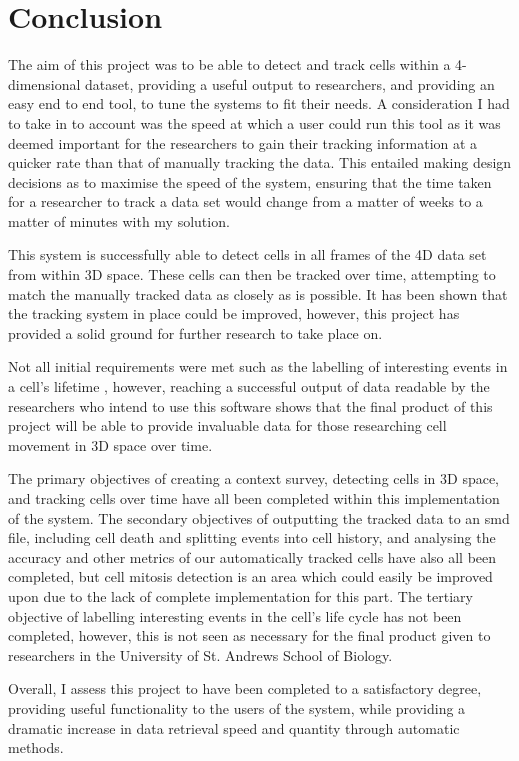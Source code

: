 \documentclass[12pt a4paper]{article}
\begin{document}
\section{Conclusion}
The aim of this project was to be able to detect and track cells within a 4-dimensional dataset, providing a useful output to researchers, and providing an easy end to end tool, to tune the systems to fit their needs. A consideration I had to take in to account was the speed at which a user could run this tool as it was deemed important for the researchers to gain their tracking information at a quicker rate than that of manually tracking the data. This entailed making design decisions as to maximise the speed of the system, ensuring that the time taken for a researcher to track a data set would change from a matter of weeks to a matter of minutes with my solution.

This system is successfully able to detect cells in all frames of the 4D data set from within 3D space. These cells can then be tracked over time, attempting to match the manually tracked data as closely as is possible. It has been shown that the tracking system in place could be improved, however, this project has provided a solid ground for further research to take place on. 

Not all initial requirements were met such as the labelling of interesting events in a cell's lifetime , however, reaching a successful output of data readable by the researchers who intend to use this software shows that the final product of this project will be able to provide invaluable data for those researching cell movement in 3D space over time.

The primary objectives of creating a context survey, detecting cells in 3D space, and tracking cells over time have all been completed within this implementation of the system. The secondary objectives of outputting the tracked data to an smd file, including cell death and splitting events into cell history, and analysing the accuracy and other metrics of our automatically tracked cells have also all been completed, but cell mitosis detection is an area which could easily be improved upon due to the lack of complete implementation for this part. The tertiary objective of labelling interesting events in the cell's life cycle has not been completed, however, this is not seen as necessary for the final product given to researchers in the University of St. Andrews School of Biology.

Overall, I assess this project to have been completed to a satisfactory degree, providing useful functionality to the users of the system, while providing a dramatic increase in data retrieval speed and quantity through automatic methods.
\end{document}
